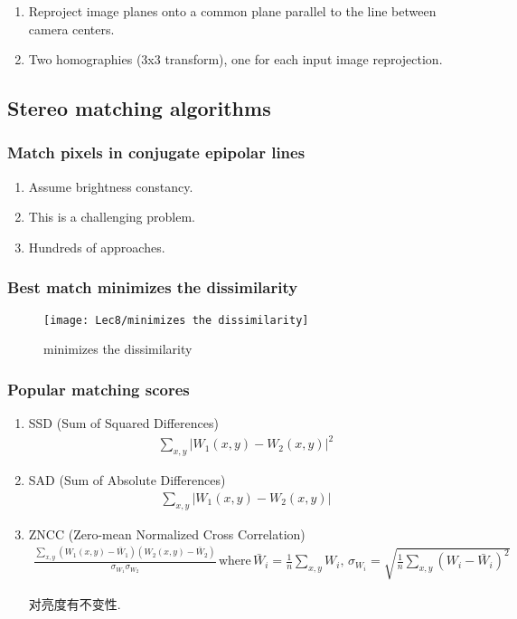 \begin{enumerate}
    \item Reproject image planes onto a common plane parallel to the line between camera centers. 
    \item Two homographies (3x3 transform), one for each input image reprojection. 
\end{enumerate}

\subsection{Stereo matching algorithms}

\subsubsection{Match pixels in conjugate epipolar lines}

\begin{enumerate}
    \item Assume brightness constancy. 
    \item This is a challenging problem. 
    \item Hundreds of approaches. 
\end{enumerate}

\subsubsection{Best match minimizes the dissimilarity}

\begin{figure}[H]
    \centering
    \texttt{[image: Lec8/minimizes the dissimilarity]}
    \caption{minimizes the dissimilarity}
\end{figure}

\subsubsection{Popular matching scores} 

\begin{enumerate}
    \item SSD (Sum of Squared Differences)
    \begin{align*}
        \sum_{x,y}\left| W_1(x,y)-W_2(x,y) \right|^2
    \end{align*}
    \item SAD (Sum of Absolute Differences)
    \begin{align*}
        \sum_{x,y}\left| W_1(x,y)-W_2(x,y) \right|
    \end{align*}
    \item ZNCC (Zero-mean Normalized Cross Correlation)
    \begin{align*}
        \frac{\sum_{x,y}(W_1(x,y)-\bar{W}_1)(W_2(x,y)-\bar{W}_2)}{\sigma_{W_1}\sigma_{W_2}} \,
        \text{where}\, \bar{W}_i=\frac{1}{n}\sum_{x,y}W_i, \, \sigma_{W_i}=\sqrt{\frac{1}{n}\sum_{x,y}(W_i-\bar{W}_i)^2}
    \end{align*}

    对亮度有不变性. 
\end{enumerate}

